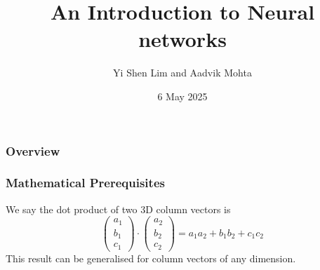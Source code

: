 \documentclass{beamer}
\title{An Introduction to Neural networks}
\author{Yi Shen Lim and Aadvik Mohta}
\date{6 May 2025}
\begin{document}
\frame{\titlepage}

\begin{frame}
\frametitle{Overview}
\tableofcontents


\end{frame}
\begin{frame}
\frametitle{Mathematical Prerequisites}
\begin{tcolorbox}
[colback=blue!5!white,colframe=blue!75!black,title= The Dot Product]
We say the dot product of two 3D column vectors is $$\begin{pmatrix}
    a_1\\
    b_1\\
    c_1
\end{pmatrix}\cdot\begin{pmatrix}
    a_2\\
    b_2\\
    c_2
\end{pmatrix}=a_1a_2+b_1b_2+c_1c_2$$ This result can be generalised for column vectors of any dimension. 
\end{tcolorbox}
\end{frame}
\end{document}
